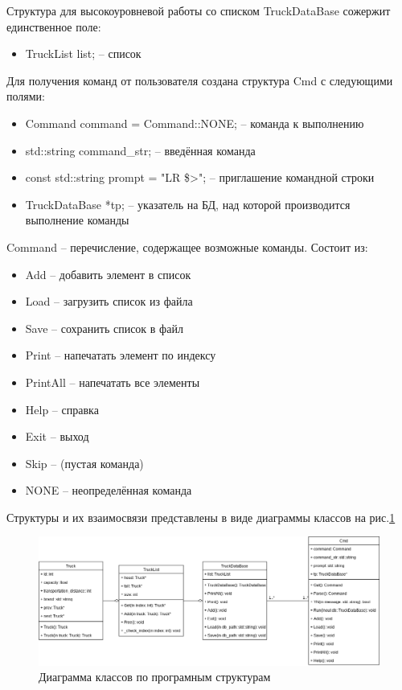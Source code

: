Структура для высокоуровневой работы со списком TruckDataBase сожержит единственное поле:

\begin{itemize}
    \item TruckList list{}; -- список
\end{itemize}

Для получения команд от пользователя создана структура Cmd с следующими полями:

\begin{itemize}
    \item Command command = Command::NONE; -- команда к выполнению
    \item std::string command\_str{}; -- введённая команда
    \item const std::string prompt = "LR \$>"; -- приглашение командной строки
    \item TruckDataBase *tp; -- указатель на БД, над которой производится выполнение команды
\end{itemize}

Command -- перечисление, содержащее возможные команды.
Состоит из:

\begin{itemize}
    \item Add -- добавить элемент в список
    \item Load -- загрузить список из файла
    \item Save -- сохранить список в файл
    \item Print -- напечатать элемент по индексу
    \item PrintAll -- напечатать все элементы
    \item Help -- справка
    \item Exit -- выход
    \item Skip -- (пустая команда)
    \item NONE -- неопределённая команда
\end{itemize}

Структуры и их взаимосвязи представлены
в виде диаграммы классов на рис.\ref{class_diagram}

\begin{figure}[htp!]
    \centering
    \includegraphics[width=0.9\linewidth]{photo/class_diagram}
    \caption{Диаграмма классов по програмным структурам}
    \label{class_diagram}
\end{figure}